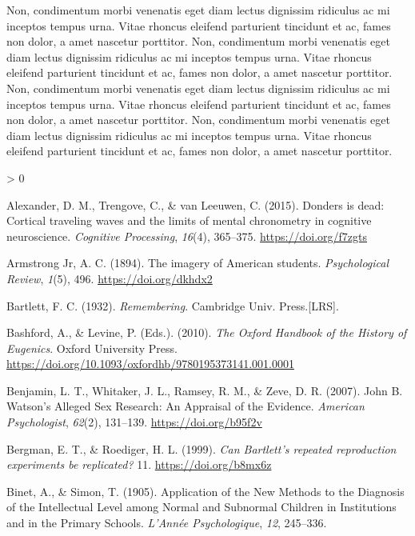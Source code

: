 \documentclass[
  oneside,
  12pt]{crumpbook}
\newlength{\cslhangindent}
\newenvironment{CSLReferences}[2] %
 {%
  \setlength{\parindent}{0pt}
  \ifodd #1 \everypar{\setlength{\hangindent}{\cslhangindent}}\ignorespaces\fi
  \ifnum #2 > 0
  \setlength{\parskip}{#2\baselineskip}
  \fi
 }%
 {}
\begin{document}
Non, condimentum morbi venenatis eget diam lectus dignissim ridiculus ac mi inceptos tempus urna. Vitae rhoncus eleifend parturient tincidunt et ac, fames non dolor, a amet nascetur porttitor. Non, condimentum morbi venenatis eget diam lectus dignissim ridiculus ac mi inceptos tempus urna. Vitae rhoncus eleifend parturient tincidunt et ac, fames non dolor, a amet nascetur porttitor. Non, condimentum morbi venenatis eget diam lectus dignissim ridiculus ac mi inceptos tempus urna. Vitae rhoncus eleifend parturient tincidunt et ac, fames non dolor, a amet nascetur porttitor. Non, condimentum morbi venenatis eget diam lectus dignissim ridiculus ac mi inceptos tempus urna. Vitae rhoncus eleifend parturient tincidunt et ac, fames non dolor, a amet nascetur porttitor.

\hypertarget{refs}{}
\begin{CSLReferences}{1}{0}
\leavevmode\hypertarget{ref-alexanderDondersDeadCortical2015}{}%
Alexander, D. M., Trengove, C., \& van Leeuwen, C. (2015). Donders is dead: Cortical traveling waves and the limits of mental chronometry in cognitive neuroscience. \emph{Cognitive Processing}, \emph{16}(4), 365--375. \url{https://doi.org/f7zgts}

\leavevmode\hypertarget{ref-armstrongjrImageryAmericanStudents1894}{}%
Armstrong Jr, A. C. (1894). The imagery of {American} students. \emph{Psychological Review}, \emph{1}(5), 496. \url{https://doi.org/dkhdx2}

\leavevmode\hypertarget{ref-bartlettRemembering1932}{}%
Bartlett, F. C. (1932). \emph{Remembering}. {Cambridge Univ. Press.{[}LRS{]}}.

\leavevmode\hypertarget{ref-bashfordOxfordHandbookHistory2010}{}%
Bashford, A., \& Levine, P. (Eds.). (2010). \emph{The {Oxford Handbook} of the {History} of {Eugenics}}. {Oxford University Press}. \url{https://doi.org/10.1093/oxfordhb/9780195373141.001.0001}

\leavevmode\hypertarget{ref-benjaminJohnWatsonAlleged2007}{}%
Benjamin, L. T., Whitaker, J. L., Ramsey, R. M., \& Zeve, D. R. (2007). John {B}. {Watson}'s {Alleged Sex Research}: {An Appraisal} of the {Evidence}. \emph{American Psychologist}, \emph{62}(2), 131--139. \url{https://doi.org/b95f2v}

\leavevmode\hypertarget{ref-bergmanCanBartlettRepeated1999}{}%
Bergman, E. T., \& Roediger, H. L. (1999). \emph{Can {Bartlett}'s repeated reproduction experiments be replicated?} 11. \url{https://doi.org/b8mx6z}

\leavevmode\hypertarget{ref-binetApplicationNewMethods1905}{}%
Binet, A., \& Simon, T. (1905). Application of the {New Methods} to the {Diagnosis} of the {Intellectual Level} among {Normal} and {Subnormal Children} in {Institutions} and in the {Primary Schools}. \emph{L'Année Psychologique}, \emph{12}, 245--336.


\end{CSLReferences}
\end{document}

